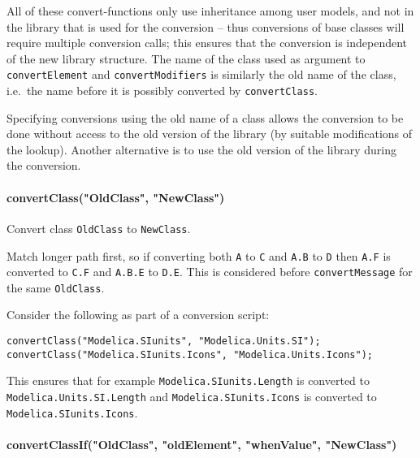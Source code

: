 All of these convert-functions only use inheritance among user models, and not in the library that is used for the conversion -- thus conversions of base classes will require multiple conversion calls; this ensures that the conversion is independent of the new library structure.
The name of the class used as argument to \lstinline!convertElement! and \lstinline!convertModifiers! is similarly the old name of the class, i.e.\ the name before it is possibly converted by \lstinline!convertClass!.

\begin{nonnormative}
Specifying conversions using the old name of a class allows the conversion to be done without access to the old
version of the library (by suitable modifications of the lookup).  Another alternative is to use the old version
of the library during the conversion.
\end{nonnormative}

\paragraph*{convertClass("OldClass", "NewClass")}\label{convertclassoldclassnewclass}

Convert class \lstinline!OldClass! to \lstinline!NewClass!.

Match longer path first, so if converting both \lstinline!A! to \lstinline!C! and \lstinline!A.B! to \lstinline!D! then \lstinline!A.F! is converted to \lstinline!C.F! and \lstinline!A.B.E! to \lstinline!D.E!. This is considered before \lstinline!convertMessage! for the same \lstinline!OldClass!.

\begin{example}
Consider the following as part of a conversion script:
\begin{lstlisting}[language=modelica]
convertClass("Modelica.SIunits", "Modelica.Units.SI");
convertClass("Modelica.SIunits.Icons", "Modelica.Units.Icons");
\end{lstlisting}
This ensures that for example \lstinline!Modelica.SIunits.Length! is converted to \lstinline!Modelica.Units.SI.Length!
and \lstinline!Modelica.SIunits.Icons! is converted to \lstinline!Modelica.SIunits.Icons!.
\end{example}

\paragraph*{convertClassIf("OldClass", "oldElement", "whenValue", "NewClass")}\label{convertclassifoldclass-oldelement-whenvalue-newclass}

